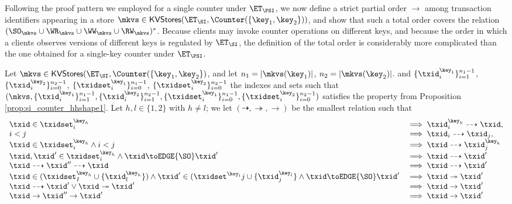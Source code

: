 Following the proof pattern we employed for a single counter under $\ET_{\PSI}$, we now 
define a strict partial order $\rightarrow$ among transaction identifiers appearing in a store 
$\mkvs \in \mathsf{KVStores}(\ET_{\SI},  \Counter(\{\key_1, \key_2\}))$, and show that such a 
total order covers the relation $(\SO_{\mkvs} \cup \WR_{\mkvs} \cup \WW_{\mkvs} \cup \RW_{\mkvs})^{\ast}$. 
Because clients may invoke counter operations on different keys, and because the 
order in which a clients observes versions of different keys is regulated by $\ET_{\SI}$, 
the definition of the total order is considerably more complicated than the one 
obtained for a single-key counter under $\ET_\PSI$.

\begin{definition}
\label{def:si_counter_order}
Let $\mkvs \in \mathsf{KVStores}(\ET_{\SI}, \Counter(\{\key_1, \key_2\})$, and let 
$n_1 = \lvert \mkvs(\key_1) \rvert$, $n_2 = \lvert \mkvs(\key_2) \rvert$. 
and $\{\txid_{i}^{\key_1}\}_{i=1}^{n_1 - 1}$, $\{\txid_{i}^{\key_2}\}_{i=0}^{n_2 - 1}$, 
$\{\txidset_{i}^{\key_1}\}_{i=0}^{n_1-1}$, $\{\txidset_{i}^{\key_2}\}_{i=0}^{n_2 - 1}$ the indexes 
and sets such that $(\mkvs, \{\txid_{i}^{\key_{1}}\}_{i=1}^{n_1 - 1}, \{\txid^{\key_2}_{i}\}_{i=1}^{n_2 - 1}, 
\{\txidset_{i}^{\key_1}\}_{i=0}^{n_1 - 1}, \{\txidset_{i}^{\key_2}\}_{i=0}^{n_2-1})$ satisfies the property from 
Proposition \ref{prop:si_counter_hhshape1}. Let $h, l \in \{1,2\}$ with $h \neq l$; we 
let $(\dashrightarrow, \twoheadrightarrow, \rightarrow)$ be the smallest relation such that 
\[
\begin{array}{ll}
\txid \in \txidset^{\key_{h}}_{i} &\implies \txid^{\key_{h}}_{i} \dashrightarrow \txid,\\
i < j &\implies \txid_{i} \dashrightarrow \txid_{j},\\
\txid \in \txidset^{\key_{h}}_{i} \land i < j & \implies \txid \dashrightarrow \txid^{\key_{h}}_{j}\\
\txid, \txid' \in \txidset^{\key_{h}}_{i} \land \txid \toEDGE{\SO} \txid' &\implies \txid \dashrightarrow \txid'\\
\txid \dashrightarrow \txid'' \dashrightarrow \txid &\implies \txid \dashrightarrow \txid'\\
\txid \in (\txidset^{\key_{h}}_{I} \cup \{\txid^{\key_{h}}_{l}\}) \land \txid' \in (\txidset^{\key_{l}}{j} \cup \{\txid^{\key_l}_{j}\} \land \txid \toEDGE{\SO} \txid' &\implies \txid \twoheadrightarrow \txid'\\
\txid \dashrightarrow \txid' \vee \txid \twoheadrightarrow \txid' &\implies \txid \rightarrow \txid'\\
\txid \rightarrow \txid'' \rightarrow \txid' &\implies \txid \rightarrow \txid'
\end{array}
\]
%
\end{definition}
